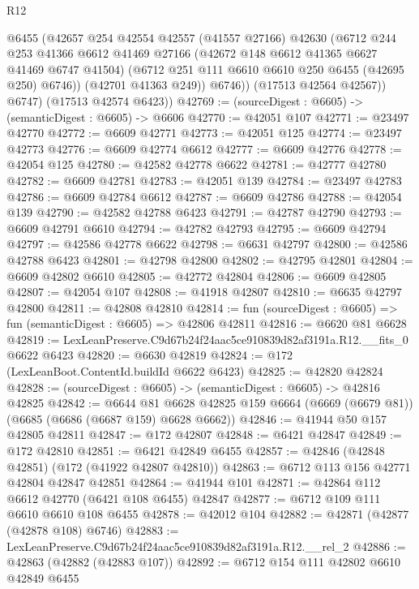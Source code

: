 \begin{lexlean}{R12}
\begin{coremodule}
              @6455
              (@42657
                @254
                @42554
                @42557
                (@41557 @27166)
                @42630
                (@6712
                  @244
                  @253
                  @41366
                  @6612
                  @41469
                  @27166
                  (@42672 @148 @6612 @41365 @6627 @41469 @6747 @41504)
                  (@6712 @251 @111 @6610 @6610 @250 @6455 (@42695 @250) @6746))
                (@42701 @41363 @249))
              @6746))
          (@17513 @42564 @42567))
        @6747)
      (@17513 @42574 @6423))
@42769 := (sourceDigest : @6605) -> (semanticDigest : @6605) -> @6606
@42770 := @42051 @107
@42771 := @23497 @42770
@42772 := @6609 @42771
@42773 := @42051 @125
@42774 := @23497 @42773
@42776 := @6609 @42774 @6612
@42777 := @6609 @42776
@42778 := @42054 @125
@42780 := @42582 @42778 @6622
@42781 := @42777 @42780
@42782 := @6609 @42781
@42783 := @42051 @139
@42784 := @23497 @42783
@42786 := @6609 @42784 @6612
@42787 := @6609 @42786
@42788 := @42054 @139
@42790 := @42582 @42788 @6423
@42791 := @42787 @42790
@42793 := @6609 @42791 @6610
@42794 := @42782 @42793
@42795 := @6609 @42794
@42797 := @42586 @42778 @6622
@42798 := @6631 @42797
@42800 := @42586 @42788 @6423
@42801 := @42798 @42800
@42802 := @42795 @42801
@42804 := @6609 @42802 @6610
@42805 := @42772 @42804
@42806 := @6609 @42805
@42807 := @42054 @107
@42808 := @41918 @42807
@42810 := @6635 @42797 @42800
@42811 := @42808 @42810
@42814 := fun (sourceDigest : @6605) => fun (semanticDigest : @6605) => @42806 @42811
@42816 := @6620 @81 @6628
@42819 := LexLeanPreserve.C9d67b24f24aac5ce910839d82af3191a.R12.__fits_0 @6622 @6423
@42820 := @6630 @42819
@42824 := @172 (LexLeanBoot.ContentId.buildId @6622 @6423)
@42825 := @42820 @42824
@42828 := (sourceDigest : @6605) -> (semanticDigest : @6605) -> @42816 @42825
@42842 := @6644
    @81
    @6628
    @42825
    @159
    @6664
    (@6669 (@6679 @81))
    (@6685 (@6686 (@6687 @159) @6628 @6662))
@42846 := @41944 @50 @157 @42805 @42811
@42847 := @172 @42807
@42848 := @6421 @42847
@42849 := @172 @42810
@42851 := @6421 @42849 @6455
@42857 := @42846 (@42848 @42851) (@172 (@41922 @42807 @42810))
@42863 := @6712 @113 @156 @42771 @42804 @42847 @42851
@42864 := @41944 @101
@42871 := @42864 @112 @6612 @42770 (@6421 @108 @6455) @42847
@42877 := @6712 @109 @111 @6610 @6610 @108 @6455
@42878 := @42012 @104
@42882 := @42871 (@42877 (@42878 @108) @6746)
@42883 := LexLeanPreserve.C9d67b24f24aac5ce910839d82af3191a.R12.__rel_2
@42886 := @42863 (@42882 (@42883 @107))
@42892 := @6712 @154 @111 @42802 @6610 @42849 @6455

\end{coremodule}
\end{lexlean}
